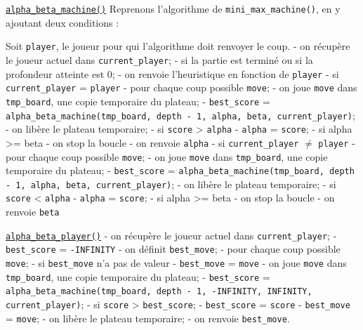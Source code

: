 \documentclass{report}
\begin{document}
\underline{\texttt{alpha\_beta\_machine()}}
\newline
\newline
Reprenons l'algorithme de \texttt{mini\_max\_machine()}, en y ajoutant deux conditions :

Soit \texttt{player}, le joueur pour qui l'algorithme doit renvoyer le coup.\newline
- on récupère le joueur actuel dans \texttt{current\_player};\newline
- si la partie est terminé ou si la profondeur atteinte est 0;
\tabto{1 cm}- on renvoie l'heuristique en fonction de \texttt{player}\newline
- si \texttt{current\_player} = \texttt{player}
\tabto{1 cm}- pour chaque coup possible \texttt{move};
\tabto{1 cm} - on joue \texttt{move} dans \texttt{tmp\_board}, une copie temporaire du plateau;
\tabto{1 cm} - \texttt{best\_score} = \texttt{alpha\_beta\_machine(tmp\_board, depth - 1, alpha, beta, current\_player)};
\tabto{1 cm} - on libère le plateau temporaire;
\tabto{1 cm} - si \texttt{score} > \texttt{alpha}
\tabto{2 cm} - \texttt{alpha} = \texttt{score};
\tabto{2 cm} - si alpha >= beta
\tabto{3 cm} - on stop la boucle
\tabto{1 cm} - on renvoie \texttt{alpha}\newline
- si \texttt{current\_player} $\ne$ \texttt{player}
\tabto{1 cm}- pour chaque coup possible \texttt{move};
\tabto{1 cm} - on joue \texttt{move} dans \texttt{tmp\_board}, une copie temporaire du plateau;
\tabto{1 cm} - \texttt{best\_score} = \texttt{alpha\_beta\_machine(tmp\_board, depth - 1, alpha, beta, current\_player)};
\tabto{1 cm} - on libère le plateau temporaire;
\tabto{1 cm} - si \texttt{score} < \texttt{alpha}
\tabto{2 cm} - \texttt{alpha} = \texttt{score};
\tabto{2 cm} - si alpha >= beta
\tabto{3 cm} - on stop la boucle
\tabto{1 cm} - on renvoie \texttt{beta}
\newline
\newline

\underline{\texttt{alpha\_beta\_player()}}
\newline
\newline
- on récupère le joueur actuel dans \texttt{current\_player};\newline
- \texttt{best\_score} = \texttt{-INFINITY}\newline
- on définit \texttt{best\_move};\newline
- pour chaque coup possible \texttt{move};
\tabto{1 cm} - si \texttt{best\_move} n'a pas de valeur
\tabto{2 cm} - \texttt{best\_move} = \texttt{move}
\tabto{1 cm} - on joue \texttt{move} dans \texttt{tmp\_board}, une copie temporaire du plateau;
\tabto{1 cm} - \texttt{best\_score} = \texttt{alpha\_beta\_machine(tmp\_board, depth - 1, -INFINITY, INFINITY, current\_player)};
\tabto{1 cm} - si \texttt{score} > \texttt{best\_score};
\tabto{2 cm} - \texttt{best\_score} = \texttt{score}
\tabto{2 cm} - \texttt{best\_move} = \texttt{move};
\tabto{1 cm} - on libère le plateau temporaire;
\newline
- on renvoie \texttt{best\_move}.\newline
\newline
\end{document}

